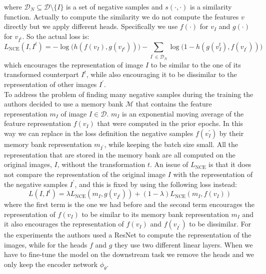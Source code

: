where $\mathcal{D}_N \subseteq \mathcal{D} \setminus \{I\}$ is a set of negative samples and $s(\cdot, \cdot)$ is a similarity function. Actually to compute the similarity we do not compute the features $v$ directly but we apply different heads. Specifically we use $f(\cdot)$ for $v_I$ and $g(\cdot)$ for $v_{I^t}$. So the actual loss is:
\[L_{\text{NCE}}(I, I^t) = -\log\big(h(f(v_I), g(v_{I^t}))\big) - \sum_{I^\prime \in \mathcal{D}_N} \log\big(1 - h(g(v^t_I), f(v_{I^\prime}))\big) \]
which encourages the representation of image $I$ to be similar to the one of its transformed counterpart $I^t$, while also encouraging it to be dissimilar to the representation of other images $I^\prime$.\\
To address the problem of finding many negative samples during the training the authors decided to use a memory bank $\mathcal{M}$ that contains the feature representation $m_I$ of image $I \in \mathcal{D}$. $m_I$ is an exponential moving average of the feature representation $f(v_I)$ that were computed in the prior epochs. In this way we can replace in the loss definition the negative samples $f(v^\prime_I)$ by their memory bank representation $m_{I^\prime}$, while keeping the batch size small. All the representation that are stored in the memory bank are all computed on the original images, $I$, without the transformation $t$. An issue of $L_{\text{NCE}}$ is that it does not compare the representation of the original image $I$ with the representation of the negative samples $I^\prime$, and this is fixed by using the following loss instead:
\[ L(I,I^t) = \lambda L_{\text{NCE}}(m_I, g(v_{I^t})) + (1-\lambda)L_{\text{NCE}}(m_I, f(v_I)) \]
where the first term is the one we had before and the second term encourages the representation of $f(v_I)$ to be similar to its memory bank representation $m_I$ and it also encourages the representation of $f(v_I)$ and $f(v_{I^\prime})$ to be dissimilar.
For the experiments the authors used a ResNet to compute the representation of the images, while for the heads $f$ and $g$ they use two different linear layers. When we have to fine-tune the model on the downstream task we remove the heads and we only keep the encoder network $\phi_\theta$.